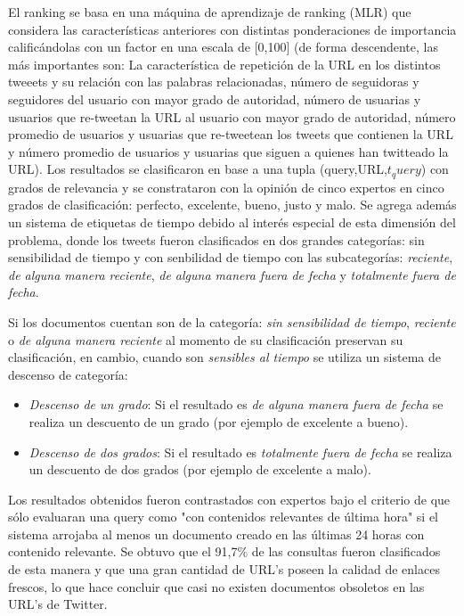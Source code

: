 	El ranking se basa en una máquina de aprendizaje de ranking (MLR) que considera las características anteriores con distintas ponderaciones de importancia calificándolas con un factor en una escala de [0,100] (de forma descendente, las más importantes son: La característica de repetición de la URL en los distintos tweeets y su relación con las palabras relacionadas, número de seguidoras y seguidores del usuario con mayor grado de autoridad, número de usuarias y usuarios que re-tweetan la URL al usuario con mayor grado de autoridad, número promedio de usuarios y usuarias que re-tweetean los tweets que contienen la URL y número promedio de usuarios y usuarias que siguen a quienes han twitteado la URL). Los resultados se clasificaron en base a una tupla (query,URL,$t_query$) con grados de relevancia y se constrataron con la opinión de cinco expertos en cinco grados de clasificación: perfecto, excelente, bueno, justo y malo. Se agrega además un sistema de etiquetas de tiempo debido al interés especial de esta dimensión del problema, donde los tweets fueron clasificados en dos grandes categorías: sin sensibilidad de tiempo y con senbilidad de tiempo con las subcategorías: \emph{reciente}, \emph{de alguna manera reciente}, \emph{de alguna manera fuera de fecha} y \emph{totalmente fuera de fecha}.
	
	Si los documentos cuentan son de la categoría: \emph{sin sensibilidad de tiempo}, \emph{reciente} o \emph{de alguna manera reciente} al momento de su clasificación preservan su clasificación, en cambio, cuando son \emph{sensibles al tiempo} se utiliza un sistema de descenso de categoría:
	
	\begin{itemize}
		\item \emph{Descenso de un grado}: Si el resultado es \emph{de alguna manera fuera de fecha} se realiza un descuento de un grado (por ejemplo de excelente a bueno).
		\item \emph{Descenso de dos grados}: Si el resultado es \emph{totalmente fuera de fecha} se realiza un descuento de dos grados (por ejemplo de excelente a malo).
	\end{itemize}
	
	Los resultados obtenidos fueron contrastados con expertos bajo el criterio de que sólo evaluaran una query como "con contenidos relevantes de última hora" si el sistema arrojaba al menos un documento creado en las últimas 24 horas con contenido relevante. Se obtuvo que el 91,7\% de las consultas fueron clasificados de esta manera y que una gran cantidad de URL's poseen la calidad de enlaces frescos, lo que hace concluir que casi no existen documentos obsoletos en las URL's de Twitter. 
	
